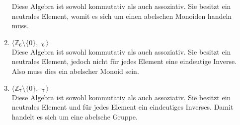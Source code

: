 \begin{enumerate}[label=(\alph*)]
        Diese Algebra ist sowohl kommutativ als auch assoziativ. Sie besitzt ein neutrales Element, womit es sich um einen abelschen Monoiden handeln muss.
        \item $\langle \mathbb{Z}_6 \setminus \{0\}, {\cdot}_6 \rangle$ \\
        Diese Algebra ist sowohl kommutativ als auch assoziativ. Sie besitzt ein neutrales Element, jedoch nicht für jedes Element eine eindeutige Inverse. Also muss dies ein abelscher Monoid sein.
        \item $\langle \mathbb{Z}_7 \setminus \{0\}, {\cdot}_7 \rangle$ \\
        Diese Algebra ist sowohl kommutativ als auch assoziativ. Sie besitzt ein neutrales Element und für jedes Element ein eindeutiges Inverses. Damit handelt es sich um eine  abelsche Gruppe.
        
    \end{enumerate}







